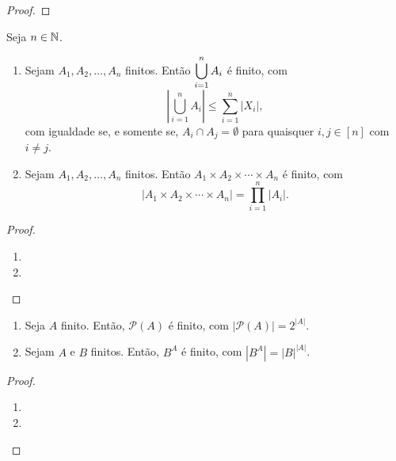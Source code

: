 \begin{proof}
    \blackproof
\end{proof}

\begin{proposition}
    Seja $n \in \mathbb{N}$.
        \begin{enumerate}[leftmargin=*, align=left, label=\textbf{(\alph*)}]
            \item Sejam $A_1, A_2, \ldots, A_n$ finitos. Então $\displaystyle \bigcup_{i=1}^{n} A_i$ é finito, com
                \[
                    \left| \bigcup_{i=1}^{n} A_i \right| \leq \sum_{i=1}^{n} |X_i|,
                \]
            com igualdade se, e somente se, $A_i \cap A_j = \emptyset$ para quaisquer $i,j \in [n]$ com $i \neq j$.
            \item Sejam $A_1, A_2, \ldots, A_n$ finitos. Então $A_1 \times A_2 \times \cdots \times A_n$ é finito, com
                \[
                    |A_1 \times A_2 \times \cdots \times A_n| = \prod_{i=1}^{n} |A_i|.
                \]
        \end{enumerate}
\end{proposition}

\begin{proof}
    \leavevmode
        \begin{enumerate}[leftmargin=*, align=left, label=\textbf{(\alph*)}]
            \item \blackproof
            \item \blackproof
        \end{enumerate}
\end{proof}

\begin{proposition}
    \leavevmode
        \begin{enumerate}[leftmargin=*, align=left, label=\textbf{(\alph*)}]
            \item Seja $A$ finito. Então, $\mathcal{P}(A)$ é finito, com $|\mathcal{P}(A)| = 2^{|A|}$.
            \item Sejam $A$ e $B$ finitos. Então, $B^A$ é finito, com $|B^A| = |B|^{|A|}$.
        \end{enumerate}
\end{proposition}

\begin{proof}
    \leavevmode
        \begin{enumerate}[leftmargin=*, align=left, label=\textbf{(\alph*)}]
            \item \blackproof
            \item \blackproof
        \end{enumerate}
\end{proof}

